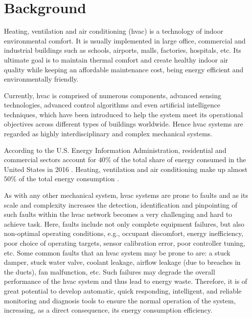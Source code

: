 \section{Background}
\label{section:background}

Heating, ventilation and air conditioning (\gls{hvac}) is a technology of indoor environmental comfort. It is usually implemented in large office, commercial and industrial buildings such as schools, airports, malls, factories, hospitals, etc. Its ultimate goal is to maintain thermal comfort and create healthy indoor air quality while keeping an affordable maintenance cost, being energy efficient and environmentally friendly.

Currently, \gls{hvac} is comprised of numerous components, advanced sensing technologies, advanced control algorithms and even artificial intelligence techniques, which have been introduced to help the system meet its operational objectives across different types of buildings worldwide. Hence \gls{hvac} systems are regarded as highly interdisciplinary and complex mechanical systems.

According to the U.S. Energy Information Administration, residential and commercial sectors account for $40\%$ of the total share of energy consumed in the United States in 2016 \cite{us_energy_usage}. Heating, ventilation and air conditioning make up almost $50\%$ of the total energy consumption \cite{residential_energy_use_us, commericial_energy_use_us}.

As with any other mechanical system, \gls{hvac} systems are prone to faults and as its scale and complexity increases the detection, identification and pinpointing of such faults within the \gls{hvac} network becomes a very challenging and hard to achieve task. Here, faults include not only complete equipment failures, but also non-optimal operating conditions, e.g., occupant discomfort, energy inefficiency, poor choice of operating targets, sensor calibration error, poor controller tuning, etc. Some common faults that an \gls{hvac} system may be prone to are: a stuck damper, stuck water valve, coolant leakage, airflow leakage (due to breaches in the ducts), fan malfunction, etc. Such failures may degrade the overall performance of the \gls{hvac} system and thus lead to energy waste. Therefore, it is of great potential to develop automatic, quick responding, intelligent, and reliable monitoring and diagnosis tools to ensure the normal operation of the system, increasing, as a direct consequence, its energy consumption efficiency.

